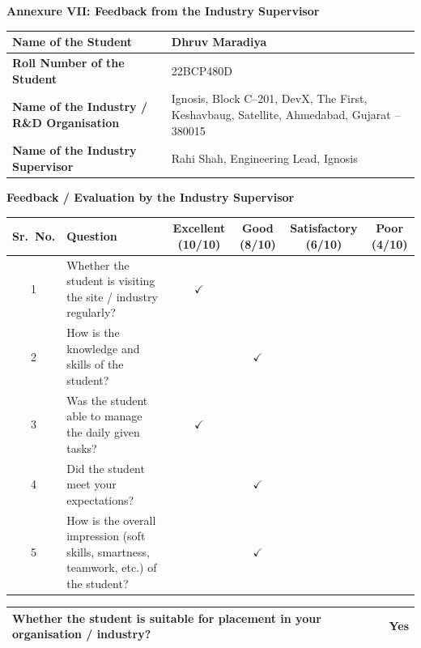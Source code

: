 \documentclass[a4paper,11pt]{article}
\begin{document}
\begin{center}
{\large \textbf{Annexure VII: Feedback from the Industry Supervisor}}
\end{center}
\vspace{0.4cm}

\begin{tabularx}{\textwidth}{|L{5cm}|X|}
\hline
\textbf{Name of the Student} & Dhruv Maradiya \\ \hline
\textbf{Roll Number of the Student} & 22BCP480D \\ \hline
\textbf{Name of the Industry / R\&D Organisation} & Ignosis, Block C--201, DevX, The First, Keshavbaug, Satellite, Ahmedabad, Gujarat -- 380015 \\ \hline
\textbf{Name of the Industry Supervisor} & Rahi Shah, Engineering Lead, Ignosis \\ \hline
\end{tabularx}

\vspace{0.5cm}

\begin{center}
\textbf{Feedback / Evaluation by the Industry Supervisor}
\end{center}

\begin{tabularx}{\textwidth}{|c|X|c|c|c|c|}
\hline
\textbf{Sr.\ No.} & \textbf{Question} & \textbf{Excellent (10/10)} & \textbf{Good (8/10)} & \textbf{Satisfactory (6/10)} & \textbf{Poor (4/10)} \\
\hline
1 & Whether the student is visiting the site / industry regularly? & $\checkmark$ & & & \\ \hline
2 & How is the knowledge and skills of the student? & & $\checkmark$ & & \\ \hline
3 & Was the student able to manage the daily given tasks? & $\checkmark$ & & & \\ \hline
4 & Did the student meet your expectations? & & $\checkmark$ & & \\ \hline
5 & How is the overall impression (soft skills, smartness, teamwork, etc.) of the student? & & $\checkmark$ & & \\ \hline
\end{tabularx}

\vspace{0.5cm}

\begin{tabularx}{\textwidth}{|L{8.5cm}|X|}
\hline
\textbf{Whether the student is suitable for placement in your organisation / industry?} & Yes \\ \hline
\end{tabularx}
\end{document}
